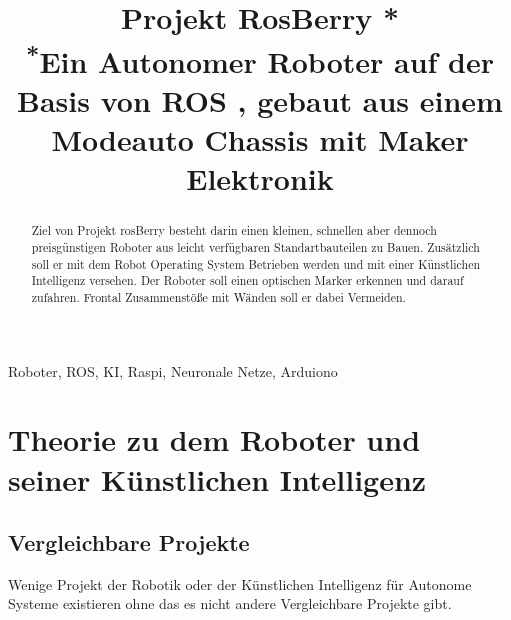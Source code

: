 \documentclass[conference]{IEEEtran}
\begin{document}
\title{Projekt RosBerry *\\
{\footnotesize \textsuperscript{*}Ein Autonomer Roboter auf der Basis von ROS , gebaut aus einem Modeauto Chassis mit Maker Elektronik}}

\author{
%
\and
{}
\and
{}
}

\maketitle

\begin{abstract}
Ziel von Projekt rosBerry besteht darin einen kleinen, schnellen aber dennoch preisgünstigen Roboter aus leicht verfügbaren Standartbauteilen zu Bauen. Zusätzlich soll er mit dem Robot Operating System Betrieben werden und mit einer Künstlichen Intelligenz versehen. Der Roboter soll einen optischen Marker erkennen und darauf zufahren. Frontal Zusammenstöße mit Wänden soll er dabei Vermeiden. 
\end{abstract}

\begin{IEEEkeywords}
Roboter, ROS, KI, Raspi, Neuronale Netze, Arduiono
\end{IEEEkeywords}

\section{Theorie zu dem Roboter und seiner Künstlichen Intelligenz}

\subsection{Vergleichbare Projekte}	%
Wenige Projekt der Robotik oder der Künstlichen Intelligenz für Autonome Systeme  existieren ohne das es nicht andere Vergleichbare Projekte gibt. \\
\end{document}
